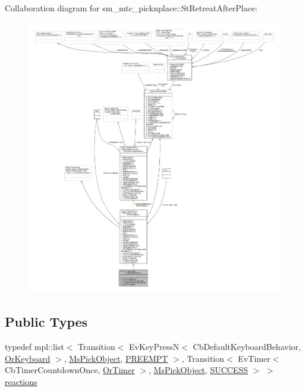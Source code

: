 Collaboration diagram for sm\+\_\+mtc\+\_\+picknplace\+:\+:St\+Retreat\+After\+Place\+:
\nopagebreak
\begin{figure}[H]
\begin{center}
\leavevmode
\includegraphics[width=350pt]{structsm__mtc__picknplace_1_1StRetreatAfterPlace__coll__graph}
\end{center}
\end{figure}
\subsection*{Public Types}
\begin{DoxyCompactItemize}
\item 
typedef mpl\+::list$<$ Transition$<$ Ev\+Key\+PressN$<$ Cb\+Default\+Keyboard\+Behavior, \hyperlink{classsm__mtc__picknplace_1_1OrKeyboard}{Or\+Keyboard} $>$, \hyperlink{classsm__mtc__picknplace_1_1MsPickObject}{Ms\+Pick\+Object}, \hyperlink{classPREEMPT}{P\+R\+E\+E\+M\+PT} $>$, Transition$<$ Ev\+Timer$<$ Cb\+Timer\+Countdown\+Once, \hyperlink{classsm__mtc__picknplace_1_1OrTimer}{Or\+Timer} $>$, \hyperlink{classsm__mtc__picknplace_1_1MsPickObject}{Ms\+Pick\+Object}, \hyperlink{classSUCCESS}{S\+U\+C\+C\+E\+SS} $>$ $>$ \hyperlink{structsm__mtc__picknplace_1_1StRetreatAfterPlace_a10691e7690f7087b795eaa28386d5f97}{reactions}
\end{DoxyCompactItemize}
